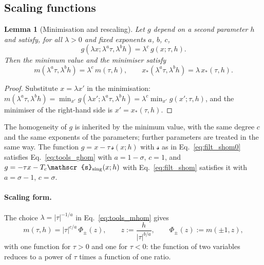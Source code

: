\documentclass[10pt,a4paper]{article}
\theoremstyle{plain}
\newtheorem{lemma}{Lemma}
\newcommand{\lds}{\mathscr{s}}  %
\begin{document}
\subsection{Scaling functions}
\label{sec:tools_scaling}

\begin{lemma}[Minimisation and rescaling]\label{lem:rescale}
Let $g$ depend on a second parameter $h$ and satisfy, for all $\lambda>0$
and fixed exponents $a$, $b$, $c$,
\begin{equation}\label{eq:tools_ghom}
  g(\lambda x;\lambda^{a}\tau,\lambda^{b}h)=\lambda^{c}\,g(x;\tau,h) .
\end{equation}
Then the minimum value and the minimiser satisfy
\begin{equation}\label{eq:tools_mhom}
  m(\lambda^{a}\tau,\lambda^{b}h)=\lambda^{c}\,m(\tau,h) ,\qquad
  x_*(\lambda^{a}\tau,\lambda^{b}h)=\lambda\,x_*(\tau,h) .
\end{equation}
\end{lemma}
\begin{proof}
Substitute $x=\lambda x'$ in the minimisation:
$m(\lambda^{a}\tau,\lambda^{b}h)=\min_{x'}g(\lambda x';\lambda^{a}\tau,\lambda^{b}h)
=\lambda^{c}\min_{x'}g(x';\tau,h)$, and the minimiser of the right-hand side
is $x'=x_*(\tau,h)$.
\end{proof}
The homogeneity of $g$ is inherited by the minimum value, with the same
degree $c$ and the same exponents of the parameters; further parameters are
treated in the same way. The function $g=x-\tau\,\lds(x;h)$ with $\lds$ as in
Eq.~\eqref{eq:filt_shom0} satisfies Eq.~\eqref{eq:tools_ghom} with
$a=1-\sigma$, $c=1$, and $g=-\tau x-T_c\lds_{\rm sing}(x;h)$ with
Eq.~\eqref{eq:filt_shom} satisfies it with $a=\sigma-1$, $c=\sigma$.

\paragraph{Scaling form.} The choice $\lambda=|\tau|^{-1/a}$ in
Eq.~\eqref{eq:tools_mhom} gives
\begin{equation}\label{eq:tools_scalingform}
  m(\tau,h)=|\tau|^{c/a}\,\Phi_\pm(z) ,\qquad
  z:=\frac{h}{|\tau|^{b/a}} ,\qquad
  \Phi_\pm(z):=m(\pm1,z) ,
\end{equation}
with one function for $\tau>0$ and one for $\tau<0$: the function of two
variables reduces to a power of $\tau$ times a function of one ratio.
\end{document}
